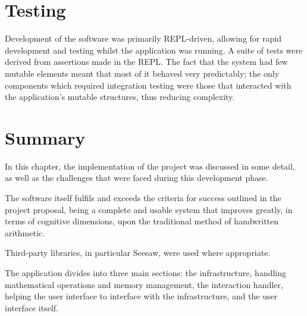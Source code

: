 \documentclass[12pt,twoside,notitlepage,xetex]{report}
\begin{document}
{\section{Testing}

Development of the software was primarily REPL-driven, allowing for rapid development and testing whilst the application was running.  A suite of tests were derived from assertions made in the REPL.  The fact that the system had few mutable elements meant that most of it behaved very predictably; the only components which required integration testing were those that interacted with the application's mutable structures, thus reducing complexity.%
%
%

\section{Summary}

In this chapter, the implementation of the project was discussed in some detail, as well as the challenges that were faced during this development phase.

The software itself fulfils and exceeds the criteria for success outlined in the project proposal, being a complete and usable system that improves greatly, in terms of cognitive dimensions, upon the traditional method of handwritten arithmetic.

Third-party libraries, in particular Seesaw, were used where appropriate.

The application divides into three main sections: the infrastructure, handling mathematical operations and memory management, the interaction handler, helping the user interface to interface with the infrastructure, and the user interface itself.

}
\end{document}
